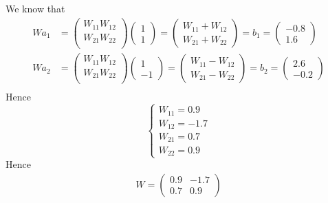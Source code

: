 \documentclass{article}
\begin{document}
    \subsection{}\label{2.1}
        We know that
        \begin{align*}
            Wa_1&=\begin{pmatrix}
                W_{11} W_{12}\\
                W_{21} W_{22}\\
            \end{pmatrix}
            \begin{pmatrix}
                1\\
                1
            \end{pmatrix}=
            \begin{pmatrix}
                W_{11}+W_{12}\\
                W_{21}+W_{22}
            \end{pmatrix}=
            b_1=
            \begin{pmatrix}
                -0.8\\
                1.6
            \end{pmatrix}\\
            Wa_2&=\begin{pmatrix}
                W_{11} W_{12}\\
                W_{21} W_{22}\\
            \end{pmatrix}
            \begin{pmatrix}
                1\\
                -1
            \end{pmatrix}=
            \begin{pmatrix}
                W_{11}-W_{12}\\
                W_{21}-W_{22}
            \end{pmatrix}=
            b_2=
            \begin{pmatrix}
                2.6\\
                -0.2
            \end{pmatrix}\\
        \end{align*}
        Hence
        \begin{equation*}
            \begin{cases}
                W_{11}=0.9\\
                W_{12}=-1.7\\
                W_{21}=0.7\\
                W_{22}=0.9
            \end{cases}
        \end{equation*}
        Hence
        \begin{align*}
            W=\begin{pmatrix}
                0.9&-1.7\\
                0.7&0.9
            \end{pmatrix}
        \end{align*}
\end{document}

